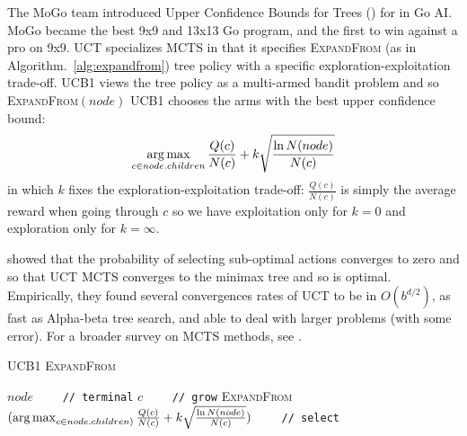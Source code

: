 The MoGo team \citep{GellyUCT, Gelly2006} introduced Upper Confidence Bounds for Trees () for  in Go AI. MoGo became the best 9x9 and 13x13 Go program, and the first to win against a pro on 9x9. UCT specializes MCTS in that it specifies \textsc{ExpandFrom} (as in Algorithm.~\ref{alg:expandfrom}) tree policy with a specific exploration-exploitation trade-off. UCB1 \citep{BanditBased} views the tree policy as a multi-armed bandit problem and so \textsc{ExpandFrom}$(node)$ UCB1 chooses the arms with the best upper confidence bound: $$\operatorname*{arg\,max}_{c \in node.children} \frac{Q(c)}{N(c)}+k\sqrt{\frac{\ln N(node)}{N(c)}}$$ in which $k$ fixes the exploration-exploitation trade-off: $\frac{Q(c)}{N(c)}$ is simply the average reward when going through $c$ so we have exploitation only for $k=0$ and exploration only for $k=\infty$.

\citet{BanditBased} showed that the probability of selecting sub-optimal actions converges to zero and so that UCT MCTS converges to the minimax tree and so is optimal. Empirically, they found several convergences rates of UCT to be in $O(b^{d/2})$, as fast as Alpha-beta tree search, and able to deal with larger problems (with some error). For a broader survey on MCTS methods, see \citep{MCTSsurvey}.

\begin{algorithm}
\caption{UCB1 \textsc{ExpandFrom}}
\label{alg:expandfrom}
\begin{algorithmic}
        \State \Return $node$ \ \ \ \ \texttt{// terminal}
    \EndIf
        \State \Return $c$ \ \ \ \ \texttt{// grow}
    \EndIf
    \State \Return \textsc{ExpandFrom}$(\operatorname*{arg\,max}_{c \in node.children)} \frac{Q(c)}{N(c)}+k\sqrt{\frac{\ln N(node)}{N(c)}})$ \ \ \ \ \texttt{// select}
\EndFunction 
\end{algorithmic}
\end{algorithm}


